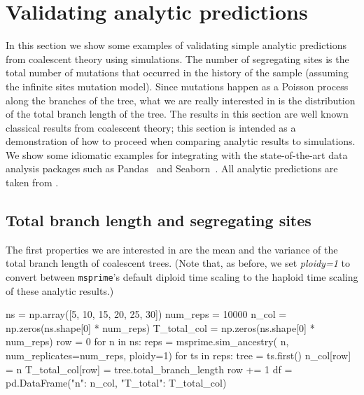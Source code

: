 \documentclass[graybox]{svmult}
\newcommand{\msprime}[0]{\texttt{msprime}}
\begin{document}

\section{Validating analytic predictions}\label{validating-analytical-predictions}

In this section we show some examples of validating simple analytic
predictions from coalescent theory using simulations. The number of
segregating sites is the total number of mutations that occurred in the
history of the sample (assuming the infinite sites mutation model).
Since mutations happen as a Poisson process along the branches of the
tree, what we are really interested in is the distribution of the total
branch length of the tree. The results in this section are well known
classical results from coalescent theory; this section is intended as a
demonstration of how to proceed when comparing analytic results to
simulations. We show some idiomatic examples for integrating with
the state-of-the-art data analysis packages such
as Pandas~\citep{mckinney2010data} and Seaborn~\citep{michael_waskom_2017_883859}.
All analytic predictions are taken from \cite{wakely2008coalescent}.

\subsection{Total branch length and segregating sites}
The first properties we are interested in are the mean and the
variance of the total branch length of coalescent trees. (Note that, as
before, we set \emph{ploidy=1} to convert between \msprime's default diploid time
scaling to the haploid time scaling of these analytic results.)

\begin{pythoncode}
ns = np.array([5, 10, 15, 20, 25, 30])
num_reps = 10000
n_col = np.zeros(ns.shape[0] * num_reps)
T_total_col = np.zeros(ns.shape[0] * num_reps)
row = 0
for n in ns:
    reps = msprime.sim_ancestry(
        n, num_replicates=num_reps, ploidy=1)
    for ts in reps:
        tree = ts.first()
        n_col[row] = n
        T_total_col[row] = tree.total_branch_length
        row += 1
df = pd.DataFrame({"n": n_col, "T_total": T_total_col})
\end{pythoncode}
\end{document}
